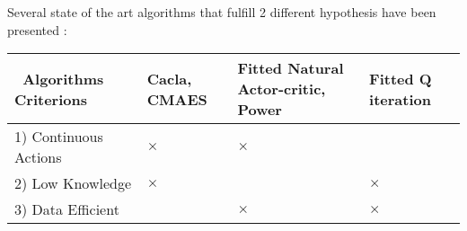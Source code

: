 Several state of the art algorithms that fulfill 2 different hypothesis have been presented :

\begin{tabular}{|p{3.4cm}|>{\centering\arraybackslash}p{1.2cm}|>{\centering\arraybackslash}p{3cm}|>{\centering\arraybackslash}p{1.8cm}|}
 \hline
 ~\mbox{Algorithms} ~ \mbox{Criterions} & Cacla, CMAES & Fitted Natural Actor-critic, Power & Fitted Q iteration \\ \hline
 1) Continuous Actions & $\times$ & $\times$ & \\ \hline
 2) Low Knowledge & $\times$ & & $\times$ \\ \hline
 3) Data Efficient &  & $\times$ & $\times$\\ \hline
\end{tabular}



